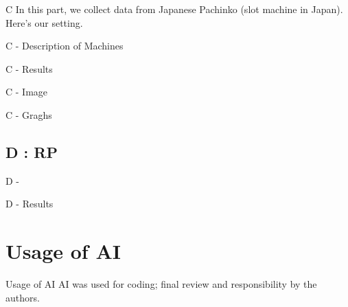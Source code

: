 \documentclass{beamer}
\begin{document}
\begin{frame}{C}
In this part, we collect data from Japanese Pachinko (slot machine in Japan).\\
Here's our setting. 

\end{frame}

\begin{frame}{C - Description of Machines}

\end{frame}

\begin{frame}{C - Results}

    
\end{frame}


\begin{frame}{C - Image}
    
\end{frame}

\begin{frame}{C - Graghs}

    
\end{frame}



\subsection{D : RP}
\begin{frame}{D -}
    
\end{frame}

\begin{frame}{D - Results}

    
\end{frame}

\section{Usage of AI}
\begin{frame}{Usage of AI}
    AI was used for coding; final review and responsibility by the authors.
\end{frame}
\end{document}
